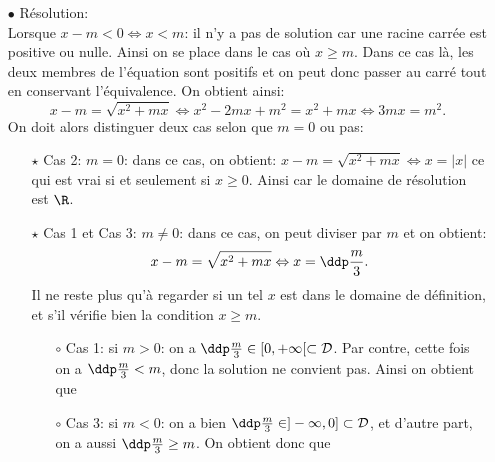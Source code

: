 \begin{correction}
\begin{enumerate}
\begin{itemize}
\begin{itemize}
\end{itemize}
\item[$\bullet$] R\'esolution:\\
\noindent Lorsque $x-m<0\Leftrightarrow x<m$: il n'y a pas de solution car une racine carr\'ee est positive ou nulle. Ainsi on se place dans le cas o\`{u} $x\geq m$. Dans ce cas l\`{a}, les deux membres de l'\'equation sont positifs et on peut donc passer au carr\'e tout en conservant l'\'equivalence. On obtient ainsi:
$$ x-m=\sqrt{x^2+mx} \Leftrightarrow x^2-2mx+m^2=x^2+mx\Leftrightarrow 3mx=m^2.$$
On doit alors distinguer deux cas selon que $m=0$ ou pas:
\begin{itemize}
\item[$\star$] Cas 2: $m=0$: dans ce cas, on obtient: $x-m=\sqrt{x^2+mx} \Leftrightarrow x = |x|$ ce qui est vrai si et seulement si $x \geq 0$. Ainsi  car le domaine de r\'esolution est $\R$.
\item[$\star$] Cas 1 et Cas 3: $m\not= 0$: dans ce cas, on peut diviser par $m$ et on obtient:
$$x-m=\sqrt{x^2+mx} \Leftrightarrow x=\ddp\frac{m}{3}.$$
Il ne reste plus qu'\`{a} regarder si un tel $x$ est dans le domaine de d\'efinition, et s'il v\'erifie bien la condition $x\geq m$.
\begin{itemize}
\item[$\circ$] Cas 1: si $m>0$: on a $\ddp\frac{m}{3}\in \lbrack 0,+\infty\lbrack \subset\mathcal{D}$. Par contre, cette fois on a $\ddp \frac{m}{3} < m$, donc la solution ne convient pas. Ainsi on obtient que   
\item[$\circ$] Cas 3: si $m<0$: on a bien $\ddp\frac{m}{3}\in \rbrack -\infty,0\rbrack\subset\mathcal{D}$, et d'autre part, on a aussi $\ddp \frac{m}{3} \geq m$. On obtient donc que  
\end{itemize}
\end{itemize}
\end{itemize}
\end{enumerate}
\end{correction}